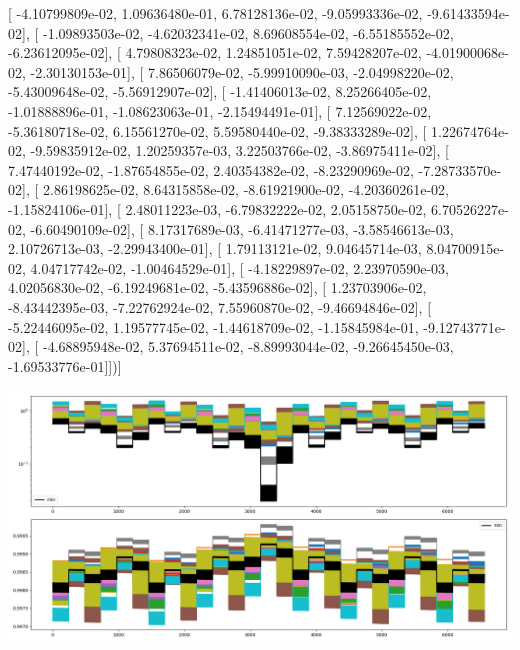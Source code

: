 \documentclass{article}
\begin{document}
       [ -4.10799809e-02,   1.09636480e-01,   6.78128136e-02,
         -9.05993336e-02,  -9.61433594e-02],
       [ -1.09893503e-02,  -4.62032341e-02,   8.69608554e-02,
         -6.55185552e-02,  -6.23612095e-02],
       [  4.79808323e-02,   1.24851051e-02,   7.59428207e-02,
         -4.01900068e-02,  -2.30130153e-01],
       [  7.86506079e-02,  -5.99910090e-03,  -2.04998220e-02,
         -5.43009648e-02,  -5.56912907e-02],
       [ -1.41406013e-02,   8.25266405e-02,  -1.01888896e-01,
         -1.08623063e-01,  -2.15494491e-01],
       [  7.12569022e-02,  -5.36180718e-02,   6.15561270e-02,
          5.59580440e-02,  -9.38333289e-02],
       [  1.22674764e-02,  -9.59835912e-02,   1.20259357e-03,
          3.22503766e-02,  -3.86975411e-02],
       [  7.47440192e-02,  -1.87654855e-02,   2.40354382e-02,
         -8.23290969e-02,  -7.28733570e-02],
       [  2.86198625e-02,   8.64315858e-02,  -8.61921900e-02,
         -4.20360261e-02,  -1.15824106e-01],
       [  2.48011223e-03,  -6.79832222e-02,   2.05158750e-02,
          6.70526227e-02,  -6.60490109e-02],
       [  8.17317689e-03,  -6.41471277e-03,  -3.58546613e-03,
          2.10726713e-03,  -2.29943400e-01],
       [  1.79113121e-02,   9.04645714e-03,   8.04700915e-02,
          4.04717742e-02,  -1.00464529e-01],
       [ -4.18229897e-02,   2.23970590e-03,   4.02056830e-02,
         -6.19249681e-02,  -5.43596886e-02],
       [  1.23703906e-02,  -8.43442395e-03,  -7.22762924e-02,
          7.55960870e-02,  -9.46694846e-02],
       [ -5.22446095e-02,   1.19577745e-02,  -1.44618709e-02,
         -1.15845984e-01,  -9.12743771e-02],
       [ -4.68895948e-02,   5.37694511e-02,  -8.89993044e-02,
         -9.26645450e-03,  -1.69533776e-01]])]
\begin{center}
\includegraphics[scale=.9]{report_pickled_controls43/control_dpn_all.png}

\end{center}
\end{document}
